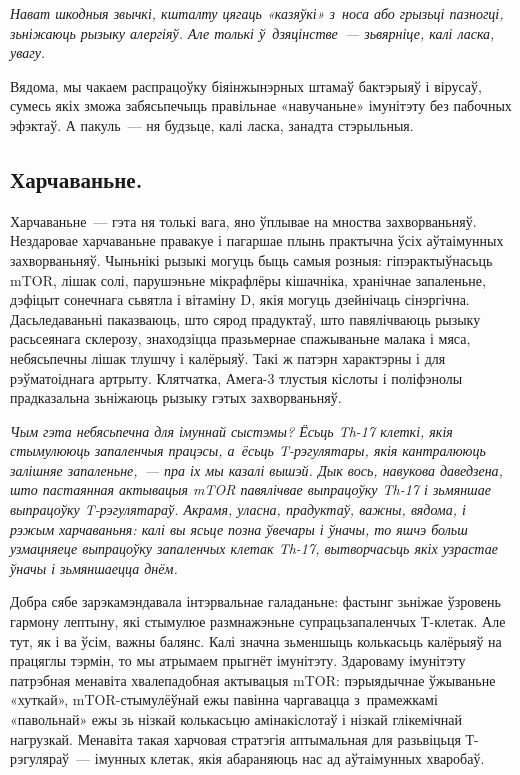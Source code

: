 \emph{Нават шкодныя звычкі, кшталту цягаць «казяўкі» з~носа або грызьці пазногці, зьніжаюць рызыку алергіяў. Але толькі ў~дзяцінстве~--- зьвярніце, калі ласка, увагу.}

Вядома, мы чакаем распрацоўку біяінжынэрных штамаў бактэрыяў і вірусаў, сумесь якіх зможа забясьпечыць правільнае «навучаньне» імунітэту без пабочных эфэктаў. А пакуль~--- ня будзьце, калі ласка, занадта стэрыльныя.

\subsection*{Харчаваньне.}

Харчаваньне~--- гэта ня толькі вага, яно ўплывае на мноства захворваньняў. Нездаровае харчаваньне правакуе і пагаршае плынь практычна ўсіх аўтаімунных захворваньняў. Чыньнікі рызыкі могуць быць самыя розныя: гіпэрактыўнасьць mTOR, лішак солі, парушэньне мікрафлёры кішачніка, хранічнае запаленьне, дэфіцыт сонечнага сьвятла і вітаміну D, якія могуць дзейнічаць сінэргічна. Дасьледаваньні паказваюць, што сярод прадуктаў, што павялічваюць рызыку расьсеянага склерозу, знаходзіцца празьмернае спажываньне малака і мяса, небясьпечны лішак тлушчу і калёрыяў. Такі ж патэрн характэрны і для рэўматоіднага артрыту. Клятчатка, Амега-3 тлустыя кіслоты і поліфэнолы прадказальна зьніжаюць рызыку гэтых захворваньняў. 


\emph{Чым гэта небясьпечна для імуннай сыстэмы? Ёсьць Th-17 клеткі, якія стымулююць запаленчыя працэсы, а~ёсьць T-рэгулятары, якія кантралююць залішняе запаленьне,~--- пра іх мы казалі вышэй. Дык вось, навукова даведзена, што пастаянная актывацыя mTOR павялічвае выпрацоўку Th-17 і зьмяншае выпрацоўку T-рэгулятараў. Акрамя, уласна, прадуктаў, важны, вядома, і рэжым харчаваньня: калі вы ясьце позна ўвечары і ўначы, то яшчэ больш узмацняеце выпрацоўку запаленчых клетак Th-17, вытворчасьць якіх узрастае ўначы і зьмяншаецца днём.}

Добра сябе зарэкамэндавала інтэрвальнае галаданьне: фастынг зьніжае ўзровень гармону лептыну, які стымулюе размнажэньне супрацьзапаленчых Т-клетак. Але тут, як і ва ўсім, важны балянс. Калі значна зьменшыць колькасьць калёрыяў на працяглы тэрмін, то мы атрымаем прыгнёт імунітэту. Здароваму імунітэту патрэбная менавіта хвалепадобная актывацыя mTOR: пэрыядычнае ўжываньне «хуткай», mTOR-стымулёўнай ежы павінна чаргавацца з~прамежкамі «павольнай» ежы зь нізкай колькасьцю амінакіслотаў і нізкай глікемічнай нагрузкай. Менавіта такая харчовая стратэгія аптымальная для разьвіцьця Т-рэгуляраў~--- імунных клетак, якія абараняюць нас ад аўтаімунных хваробаў.

